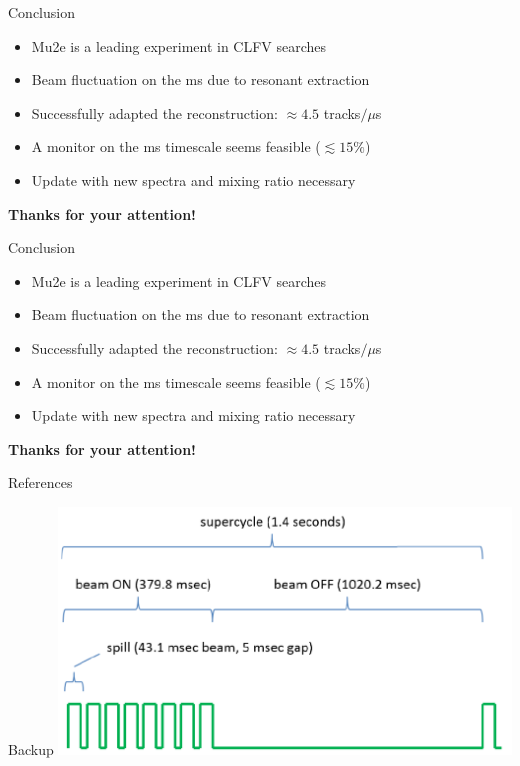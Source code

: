 \documentclass[10pt]{beamer}
\begin{document}
%
\begin{frame}{Conclusion}
\begin{itemize}
\setlength\itemsep{0.4cm}
\item Mu2e is a leading experiment in CLFV searches
\item Beam fluctuation on the ms due to resonant extraction
\item Successfully adapted the reconstruction: $\approx 4.5$ tracks$/\mu$s 
\item A monitor on the ms timescale seems feasible ($\lesssim 15 \%$) 
\item Update with new spectra and mixing ratio necessary
\end{itemize}
\vspace{1cm}
\centering
{\large \textbf{Thanks for your attention!}}
\end{frame}

\begin{frame}{Conclusion}
\begin{itemize}
\setlength\itemsep{0.4cm}
\item Mu2e is a leading experiment in CLFV searches
\item Beam fluctuation on the ms due to resonant extraction
\item Successfully adapted the reconstruction: $\approx 4.5$ tracks$/\mu$s 
\item A monitor on the ms timescale seems feasible ($\lesssim 15 \%$) 
\item Update with new spectra and mixing ratio necessary
\end{itemize}
\vspace{1cm}
\centering
{\large \textbf{Thanks for your attention!}}
\end{frame}

\begin{frame}[allowframebreaks]{References}
\printbibliography[heading=none]
\end{frame}

\begin{frame}{Backup}
\centering
\includegraphics[width=0.9\textwidth]{beam_time_structure}
\end{frame}
\end{document}
